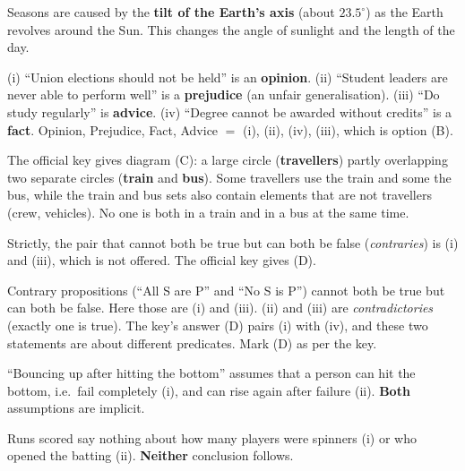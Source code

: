 Seasons are caused by the \textbf{tilt of the Earth's axis} (about $23.5^\circ$) as the Earth revolves around the Sun. This changes the angle of sunlight and the length of the day.

(i) ``Union elections should not be held'' is an \textbf{opinion}. (ii) ``Student leaders are never able to perform well'' is a \textbf{prejudice} (an unfair generalisation). (iii) ``Do study regularly'' is \textbf{advice}. (iv) ``Degree cannot be awarded without credits'' is a \textbf{fact}.
Opinion, Prejudice, Fact, Advice $=$ (i), (ii), (iv), (iii), which is option (B).


The official key gives diagram (C): a large circle (\textbf{travellers}) partly overlapping two separate circles (\textbf{train} and \textbf{bus}). Some travellers use the train and some the bus, while the train and bus sets also contain elements that are not travellers (crew, vehicles). No one is both in a train and in a bus at the same time.

Strictly, the pair that cannot both be true but can both be false (\emph{contraries}) is (i) and (iii), which is not offered. The official key gives (D).

Contrary propositions (``All S are P'' and ``No S is P'') cannot both be true but can both be false. Here those are (i) and (iii). (ii) and (iii) are \emph{contradictories} (exactly one is true). The key's answer (D) pairs (i) with (iv), and these two statements are about different predicates. Mark (D) as per the key.

``Bouncing up after hitting the bottom'' assumes that a person can hit the bottom, i.e.\ fail completely (i), and can rise again after failure (ii). \textbf{Both} assumptions are implicit.

Runs scored say nothing about how many players were spinners (i) or who opened the batting (ii). \textbf{Neither} conclusion follows.

